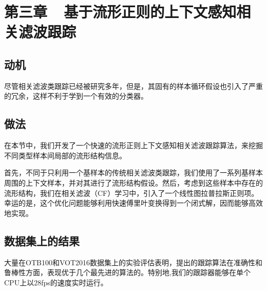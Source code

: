 ﻿\chapter{第三章~~基于流形正则的上下文感知相关滤波跟踪}
\label{chap02}

\section{动机}
尽管相关滤波类跟踪已经被研究多年，但是，其固有的样本循环假设也引入了严重的冗余，这样不利于学到一个有效的分类器。



\section{做法}
在本节中，我们开发了一个快速的流形正则上下文感知相关滤波跟踪算法，来挖掘不同类型样本间局部的流形结构信息。

首先，不同于只利用一个基样本的传统相关滤波类跟踪，我们使用了一系列基样本周围的上下文样本，并对其进行了流形结构假设。然后，考虑到这些样本中存在的流形结构，我们在相关滤波（CF）学习中，引入了一个线性图拉普拉斯正则项。幸运的是，这个优化问题能够利用快速傅里叶变换得到一个闭式解，因而能够高效地实现。
\section{数据集上的结果}

大量在OTB100和VOT2016数据集上的实验评估表明，提出的跟踪算法在准确性和鲁棒性方面，表现优于几个最先进的算法的。特别地,我们的跟踪器能够在单个CPU上以28fps的速度实时运行。


